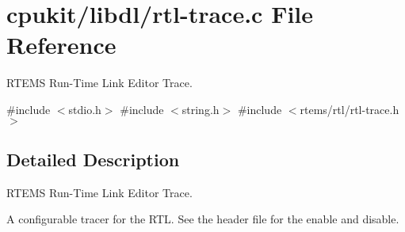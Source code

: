 \hypertarget{rtl-trace_8c}{}\section{cpukit/libdl/rtl-\/trace.c File Reference}
\label{rtl-trace_8c}


R\+T\+E\+MS Run-\/\+Time Link Editor Trace.  


{\ttfamily \#include $<$stdio.\+h$>$}\newline
{\ttfamily \#include $<$string.\+h$>$}\newline
{\ttfamily \#include $<$rtems/rtl/rtl-\/trace.\+h$>$}\newline


\subsection{Detailed Description}
R\+T\+E\+MS Run-\/\+Time Link Editor Trace. 

A configurable tracer for the R\+TL. See the header file for the enable and disable. 